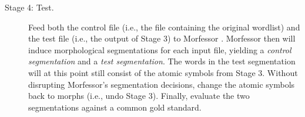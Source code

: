 \begin{description}
\item[Stage 4: Test.]
Feed both the control file (i.e., the file containing the original wordlist) and the test file (i.e., the output of Stage 3) to
Morfessor \citep{creutz-and-lagus:2005, creutz-and-lagus:2007}. Morfessor then will induce morphological segmentations for each input file, yielding a \emph{control segmentation} and a \emph{test segmentation}. The words in the test segmentation will at this point still consist of the atomic symbols from Stage 3. Without disrupting Morfessor's segmentation decisions, change the atomic symbols back to morphs (i.e., undo Stage 3). Finally, evaluate the two segmentations against a common gold standard.
\end{description}
